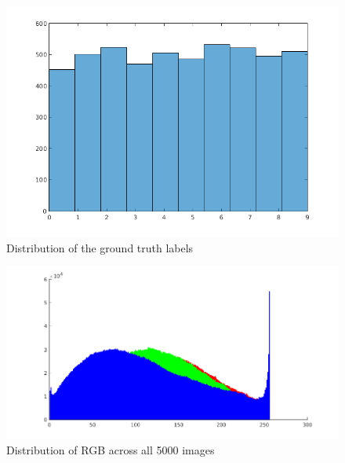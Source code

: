 \documentclass{article} %
\begin{document}
    \begin{figure}[h]
        \centering
        \includegraphics[width=.4\linewidth]{label-distribution.png}
        \caption{Distribution of the ground truth labels}
    \end{figure}
    \begin{figure}[h]
        \centering
        \includegraphics[width=.4\linewidth]{hist-overall.png}
        \caption{Distribution of RGB across all 5000 images}
    \end{figure}
\end{document}
